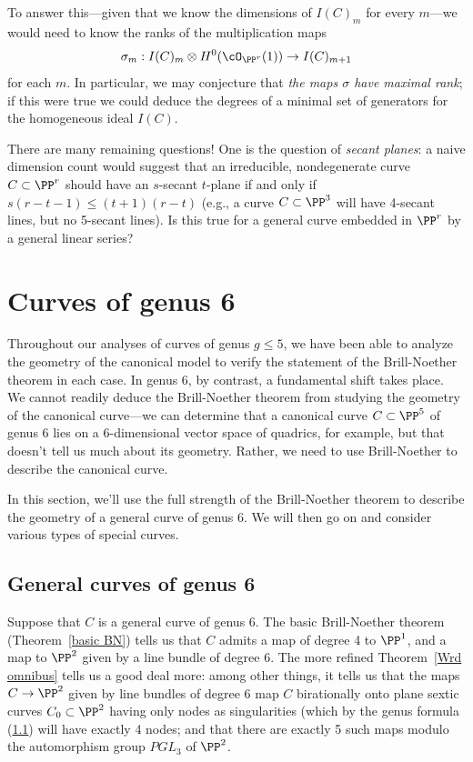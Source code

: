 To answer this---given that we know the dimensions of $I(C)_m$ for every $m$---we would need to know the ranks of the multiplication maps
$$
\sigma_m : I(C)_m \otimes H^0(\cO_{\PP^r}(1)) \to I(C)_{m+1}
$$
for each $m$. In particular, we may conjecture that \emph{the maps $\sigma$ have maximal rank}; if this were true we could deduce the degrees of a minimal set of generators for the homogeneous ideal $I(C)$.


There are many remaining questions! One is the question of \emph{secant planes}: a naive dimension count would suggest that an irreducible, nondegenerate curve $C \subset \PP^r$ should have an $s$-secant $t$-plane if and only if $s(r-t-1) \leq (t+1)(r-t)$
(e.g., a curve $C \subset \PP^3$ will have 4-secant lines, but no 5-secant lines). Is this true for a general curve embedded in $\PP^r$ by a general linear series?



\section{Curves of genus 6}\label{genus 6 section}


Throughout our analyses of curves of genus $g \leq 5$, we have been able to analyze the geometry of the canonical model to verify the statement of the Brill-Noether theorem in each case. In genus 6, by contrast, a fundamental shift takes place. We cannot readily deduce the Brill-Noether theorem from studying the geometry of the canonical curve---we can determine that a canonical curve $C \subset \PP^5$ of genus 6 lies on a 6-dimensional vector space of quadrics, for example, but that doesn't tell us much about its geometry. Rather, we need to use Brill-Noether to describe the canonical curve. 

In this section, we'll use the full strength of the Brill-Noether theorem to describe the geometry of a general curve of genus 6. We will then go on and consider various types of special curves.

\subsection{General curves of genus 6}

Suppose that $C$ is a general curve of genus 6. The basic Brill-Noether theorem (Theorem~\ref{basic BN}) tells us that $C$ admits a map of degree 4 to $\PP^1$, and a map to $\PP^2$ given by a line bundle of degree 6. The more refined Theorem~\ref{Wrd omnibus} tells us a good deal more: among other things, it tells us that the maps $C \to \PP^2$ given by line bundles of degree 6 map $C$ birationally onto plane sextic curves $C_0 \subset \PP^2$ having only nodes as singularities (which by the genus formula (\ref{}) will have exactly 4 nodes; and that there are exactly 5 such maps modulo the automorphism group $PGL_3$ of $\PP^2$.

